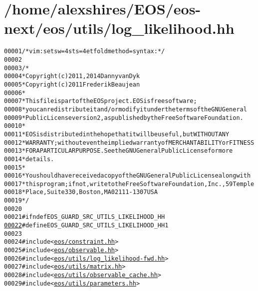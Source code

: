 \hypertarget{log__likelihood_8hh_source}{
\section{/home/alexshires/EOS/eos-\/next/eos/utils/log\_\-likelihood.hh}
}


\begin{footnotesize}\begin{alltt}
00001 \textcolor{comment}{/* vim: set sw=4 sts=4 et foldmethod=syntax : */}
00002 
00003 \textcolor{comment}{/*}
00004 \textcolor{comment}{ * Copyright (c) 2011, 2014 Danny van Dyk}
00005 \textcolor{comment}{ * Copyright (c) 2011 Frederik Beaujean}
00006 \textcolor{comment}{ *}
00007 \textcolor{comment}{ * This file is part of the EOS project. EOS is free software;}
00008 \textcolor{comment}{ * you can redistribute it and/or modify it under the terms of the GNU General}
00009 \textcolor{comment}{ * Public License version 2, as published by the Free Software Foundation.}
00010 \textcolor{comment}{ *}
00011 \textcolor{comment}{ * EOS is distributed in the hope that it will be useful, but WITHOUT ANY}
00012 \textcolor{comment}{ * WARRANTY; without even the implied warranty of MERCHANTABILITY or FITNESS}
00013 \textcolor{comment}{ * FOR A PARTICULAR PURPOSE.  See the GNU General Public License for more}
00014 \textcolor{comment}{ * details.}
00015 \textcolor{comment}{ *}
00016 \textcolor{comment}{ * You should have received a copy of the GNU General Public License along with}
00017 \textcolor{comment}{ * this program; if not, write to the Free Software Foundation, Inc., 59 Temple}
00018 \textcolor{comment}{ * Place, Suite 330, Boston, MA  02111-1307  USA}
00019 \textcolor{comment}{ */}
00020 
00021 \textcolor{preprocessor}{#ifndef EOS\_GUARD\_SRC\_UTILS\_LIKELIHOOD\_HH}
\hypertarget{log__likelihood_8hh_source_l00022}{}\hyperlink{log__likelihood_8hh_a5a4c0a95f563cced9ee3e232e56ff9a7}{00022} \textcolor{preprocessor}{}\textcolor{preprocessor}{#define EOS\_GUARD\_SRC\_UTILS\_LIKELIHOOD\_HH 1}
00023 \textcolor{preprocessor}{}
00024 \textcolor{preprocessor}{#include <\hyperlink{constraint_8hh}{eos/constraint.hh}>}
00025 \textcolor{preprocessor}{#include <\hyperlink{observable_8hh}{eos/observable.hh}>}
00026 \textcolor{preprocessor}{#include <\hyperlink{log__likelihood-fwd_8hh}{eos/utils/log_likelihood-fwd.hh}>}
00027 \textcolor{preprocessor}{#include <\hyperlink{matrix_8hh}{eos/utils/matrix.hh}>}
00028 \textcolor{preprocessor}{#include <\hyperlink{observable__cache_8hh}{eos/utils/observable_cache.hh}>}
00029 \textcolor{preprocessor}{#include <\hyperlink{parameters_8hh}{eos/utils/parameters.hh}>}

\end{alltt}
\end{footnotesize}
